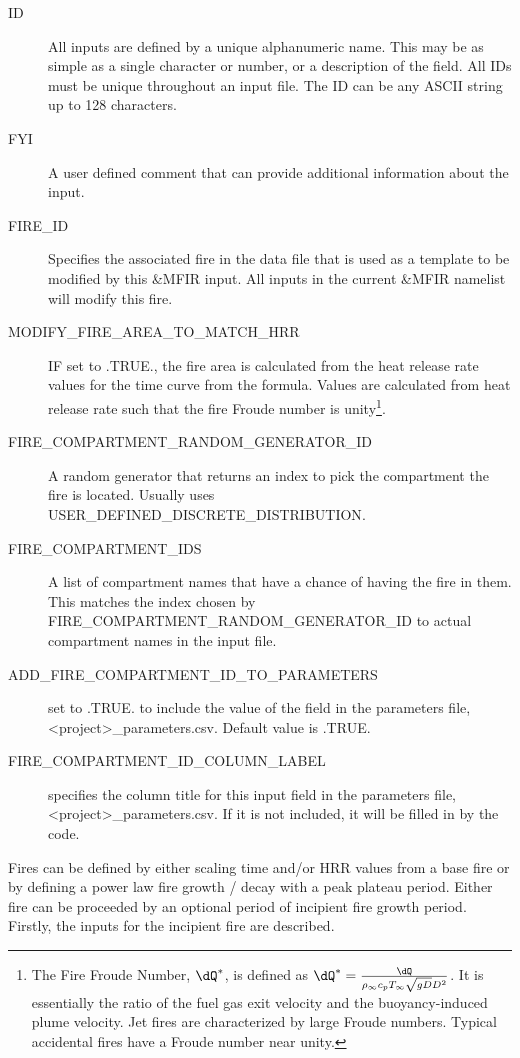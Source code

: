 \documentclass[12pt,twoside]{book}
\begin{document}
\begin{description}
  \item[ID] All inputs are defined by a unique alphanumeric name. This may be as simple as a single character or number, or a description of the field. All IDs must be unique throughout an input file. The { \ct ID} can be any ASCII string up to 128 characters.
  \item[FYI] A user defined comment that can provide additional information about the input.
  \item[FIRE\_ID] Specifies the associated fire in the data file that is used as a template to be modified by this {\ct \&MFIR} input. All inputs in the current {\ct \&MFIR} namelist will modify this fire.
  \item[MODIFY\_FIRE\_AREA\_TO\_MATCH\_HRR] IF set to {\ct .TRUE.}, the fire area is calculated from the heat release rate values for the time curve from the formula. Values are calculated from heat release rate such that the fire Froude number is unity\footnote{The Fire Froude Number, $\dQ^*$, is defined as $\dQ^* = \frac{\dQ}{\rho_\infty c_p T_\infty \sqrt{gD} D^2}$. It is essentially the ratio of the fuel gas exit velocity and the buoyancy-induced plume velocity. Jet fires are characterized by large Froude numbers. Typical accidental fires have a Froude number near unity.}.
  \item[FIRE\_COMPARTMENT\_RANDOM\_GENERATOR\_ID] A random generator that returns an index to pick the compartment the fire is located. Usually uses \\
      {\ct USER\_DEFINED\_DISCRETE\_DISTRIBUTION}.
  \item[FIRE\_COMPARTMENT\_IDS] A list of compartment names that have a chance of having the fire in them. This matches the index chosen by {\ct FIRE\_COMPARTMENT\_RANDOM\_GENERATOR\_ID} to actual compartment names in the input file.
  \item[ADD\_FIRE\_COMPARTMENT\_ID\_TO\_PARAMETERS] set to .TRUE. to include the value of the field in the parameters file, {\ct <project>\_parameters.csv}. Default value is .TRUE.
  \item[FIRE\_COMPARTMENT\_ID\_COLUMN\_LABEL] specifies the column title for this input field in the parameters file, {\ct <project>\_parameters.csv}. If it is not included, it will be filled in by the code.
  \end{description}
Fires can be defined by either scaling time and/or HRR values from a base fire or by defining a power law fire growth / decay with a peak plateau period. Either fire can be proceeded by an optional period of incipient fire growth period. Firstly, the inputs for the incipient fire are described.
\end{document}
